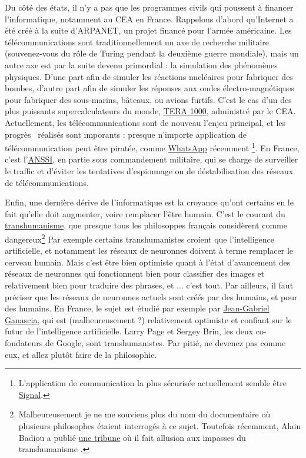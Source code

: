 \documentclass[10pt]{article}
\begin{document}
Du côté des états, il n'y a pas que les programmes civils qui poussent à financer l'informatique, notamment au CEA en France.
Rappelons d'abord qu'Internet a été créé à la suite d'ARPANET, un projet financé pour l'armée américaine. Les télécommunications
sont traditionnellement un axe de recherche militaire (souvenez-vous du rôle de Turing pendant la deuxième guerre mondiale),
mais un autre axe est par la suite devenu primordial : la simulation des phénomènes physiques. D'une part afin de simuler les réactions
nucléaires pour fabriquer des bombes, d'autre part afin de simuler les réponses aux ondes électro-magnétiques pour fabriquer
des sous-marins, bâteaux, ou avions furtifs. C'est le cas d'un des plus puissants supercalculateurs du monde,
\href{https://fr.wikipedia.org/wiki/TERA-1000}{TERA 1000}, administré par le CEA. Actuellement, les télécommunications sont de nouveau
l'enjeu principal, et les \og progrès \fg~réalisés sont imporants : presque n'importe application de télécommunication peut être
piratée, comme
\href{https://www.lemonde.fr/pixels/article/2019/05/14/une-faille-de-securite-de-whatsapp-utilisee-pour-installer-un-logiciel-espion-israelien_5461861_4408996.html}{WhatsApp}
récemment \footnote{L'application de communication la plus sécurisée actuellement semble être \href{https://signal.org/fr/}{Signal}.}.
En France, c'est l'\href{https://www.ssi.gouv.fr/}{ANSSI}, en partie sous commandement militaire, qui se charge de surveiller le traffic et d'éviter les tentatives d'espionnage
ou de déstabilisation des réseaux de télécommunications.


Enfin, une dernière dérive de l'informatique est la croyance qu'ont certains en
le fait qu'elle doit augmenter, voire remplacer l'être humain. C'est le courant du \href{https://fr.wikipedia.org/wiki/Transhumanisme}{transhumanisme},
que presque tous les philosoppes français considèrent comme dangereux\footnote{
  Malheureusement je ne me souviens plus du nom du documentaire où plusieurs philosophes étaient interrogés à ce sujet.
  Toutefois récemment, Alain Badiou a publié
  \href{https://www.lemonde.fr/series-d-ete-2018-long-format/article/2018/07/26/le-capitalisme-seul-responsable-de-l-exploitation-destructrice-de-la-nature_5336333_5325928.html?xtmc=badiou_capitalisme&xtcr=1}{une tribune}
  où il fait allusion aux \og impasses du transhumanisme \fg.
} 
Par exemple certains transhumanistes croient que l'intelligence artificielle, et notamment les réseaux de neuronnes
doivent à terme remplacer le cerveau humain. Mais c'est être bien optimiste quant à l'état d'avancement des réseaux
de neuronnes qui fonctionnent bien pour classifier des images et relativement bien pour traduire des phrases, et ... c'est tout.
Par ailleurs, il faut préciser que les réseaux de neuronnes actuels sont créés par des humains, et pour des humains.
En France, le sujet est étudié par exemple par \href{https://fr.wikipedia.org/wiki/Jean-Gabriel_Ganascia}{Jean-Gabriel Ganascia},
qui est (malheureusement ?) relativement optimiste et confiant sur le futur de l'intelligence artificielle. 
Larry Page et Sergey Brin, les deux co-fondateurs de Google, sont transhumanistes.
Par pitié, ne devenez pas comme eux, et allez plutôt faire de la philosophie.
\end{document}
